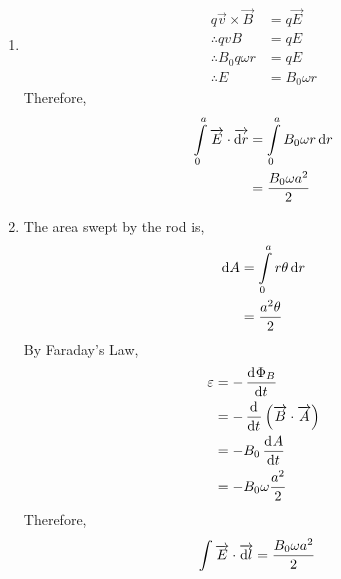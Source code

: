\documentclass[fleqn, a4paper, 12pt, twoside]{article}
\theoremstyle{definition}
\theoremstyle{theorem}
\begin{document}
\begin{solution}
	\begin{enumerate}[leftmargin = *]
		\item
			\begin{align*}
				q \overrightarrow{v} \times \overrightarrow{B} & = q \overrightarrow{E} \\
				\therefore q v B                               & = q E                  \\
				\therefore B_0 q \omega r                      & = q E                  \\
				\therefore E                                   & = B_0 \omega r
			\end{align*}
			Therefore,
			\begin{align*}
				\int\limits_{0}^{a} \overrightarrow{E} \cdot \overrightarrow{\dif r} & = \int\limits_{0}^{a} B_0 \omega r \dif r \\
                                                                                                     & = \frac{B_0 \omega a^2}{2}
			\end{align*}
		\item
			The area swept by the rod is,
			\begin{align*}
				\dif A & = \int\limits_{0}^{a} r \theta \dif r \\
                                       & = \frac{a^2 \theta}{2}                \\
			\end{align*}
			By Faraday's Law,
			\begin{align*}
				\varepsilon & = -\dod{\Phi_B}{t}                                                     \\
                                            & = -\dod{}{t}\left( \overrightarrow{B} \cdot \overrightarrow{A} \right) \\
                                            & = -B_0 \dod{A}{t}                                                      \\
                                            & = -B_0 \omega \frac{a^2}{2}                                            \\
			\end{align*}
			Therefore,
			\begin{align*}
				\int \overrightarrow{E} \cdot \overrightarrow{\dif l} & = \frac{B_0 \omega a^2}{2}
			\end{align*}
	\end{enumerate}
\end{solution}
\end{document}
